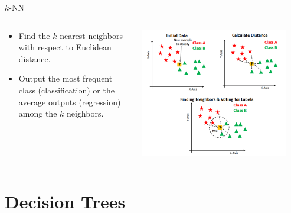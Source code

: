   \begin{frame}{$k$-NN}
    \begin{columns}
      \begin{column}{0.4\textwidth}  
      \begin{itemize}
          \item Find the $k$ nearest neighbors with respect to Euclidean distance.
          \item Output the most frequent class (classification) or the average outputs (regression) among the $k$ neighbors.
      \end{itemize}
      \end{column}
      \begin{column}{0.6\textwidth}
        \includegraphics[width=0.9\textwidth]{images/knn.png}
      \end{column}
    \end{columns}
  \end{frame}

\section{Decision Trees}

